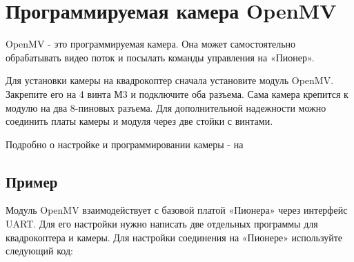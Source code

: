 \documentclass[a4paper,10pt,russian]{sphinxmanual}
\begin{document}
\section{Программируемая камера OpenMV}
\label{\detokenize{module/openMV:openmv}}\label{\detokenize{module/openMV::doc}}

OpenMV - это программируемая камера. Она может самостоятельно обрабатывать видео поток и посылать команды управления на «Пионер».

Для установки камеры на квадрокоптер сначала установите модуль OpenMV. Закрепите его на 4 винта М3 и подключите оба разъема. Сама камера крепится к модулю на два 8-пиновых разъема. Для дополнительной надежности можно соединить платы камеры и модуля через две стойки с винтами.

Подробно о настройке и программировании камеры - на 


\subsection{Пример}
\label{\detokenize{module/openMV:id2}}
Модуль OpenMV взаимодействует с базовой платой «Пионера» через интерфейс UART. Для его настройки нужно написать две отдельных программы для квадрокоптера и камеры.
Для настройки соединения на «Пионере» используйте следующий код:

%
\begin{sphinxVerbatim}[commandchars=\\\{\}]
   
        
       
   
   
      
\end{sphinxVerbatim}
\end{document}
